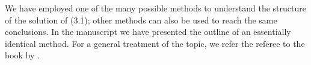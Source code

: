 \documentclass[letterpaper,10pt]{article}
\newcommand{\Ndg}{\tilde{N}_g}
\begin{document}
% 
% 
We have employed one of the many possible methods to understand the structure of the solution of (3.1); other methods can also be used to reach the same conclusions.
In the manuscript we have presented the outline of an essentially identical method.
For a general treatment of the topic, we refer the referee to the book by \cite{Hinch1991}. %


\newpage
{}

% 
% 
% 
% 
% 
% 
% 
\end{document}
